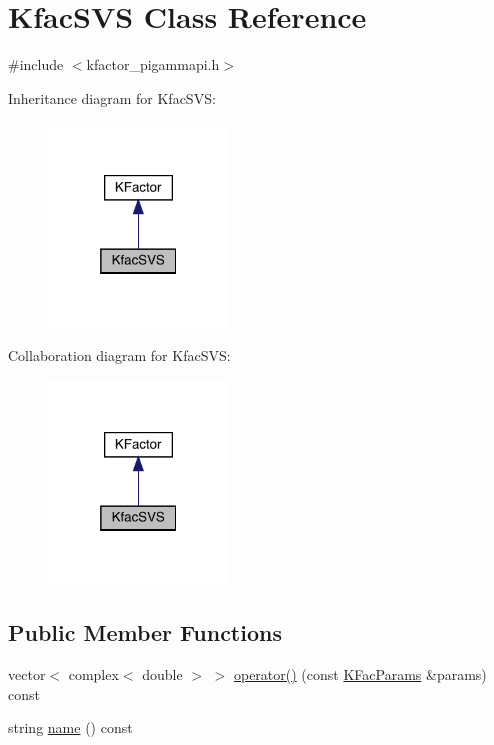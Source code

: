 \hypertarget{classKfacSVS}{}\section{Kfac\+S\+VS Class Reference}
\label{classKfacSVS}


{\ttfamily \#include $<$kfactor\+\_\+pigammapi.\+h$>$}



Inheritance diagram for Kfac\+S\+VS\+:
\nopagebreak
\begin{figure}[H]
\begin{center}
\leavevmode
\includegraphics[width=136pt]{d9/df2/classKfacSVS__inherit__graph}
\end{center}
\end{figure}


Collaboration diagram for Kfac\+S\+VS\+:
\nopagebreak
\begin{figure}[H]
\begin{center}
\leavevmode
\includegraphics[width=136pt]{d2/dc7/classKfacSVS__coll__graph}
\end{center}
\end{figure}
\subsection*{Public Member Functions}
\begin{DoxyCompactItemize}
\item 
vector$<$ complex$<$ double $>$ $>$ \mbox{\hyperlink{classKfacSVS_a1bcfae29380c602c7040ad790ccff63f}{operator()}} (const \mbox{\hyperlink{classKFacParams}{K\+Fac\+Params}} \&params) const
\item 
string \mbox{\hyperlink{classKfacSVS_af7a1fd20af79d6a2f844cf4418a5eeb8}{name}} () const
\end{DoxyCompactItemize}


